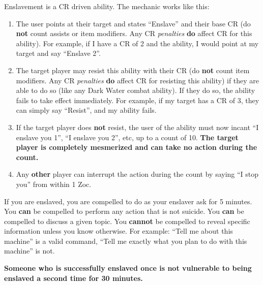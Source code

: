 \documentclass[green]{elementals}
\begin{document}
\name{\gEnslave{}} 

Enslavement is a CR driven ability. The mechanic works like this:

\begin{enumerate}
 \item The user points at their target and states ``Enslave'' and their base CR (do {\bf not} count assists or item modifiers. Any CR \emph{penalties} {\bf do} affect CR for this ability). For example, if I have a CR of 2 and the ability, I would point at my target and say ``Enslave 2''. 
 \item The target player may resist this ability with their CR (do {\bf not} count item modifiers. Any CR \emph{penalties} {\bf do} affect CR for resisting this ability) if they are able to do so (like any Dark Water combat ability). If they do so, the ability fails to take effect immediately. For example, if my target has a CR of 3, they can simply say ``Resist'', and my ability fails.
 \item If the target player does {\bf not} resist, the user of the ability must now incant ``I enslave you 1'', ``I enslave you 2'', etc, up to a count of 10. {\bf The target player is completely mesmerized and can take no action during the count.}
 \item Any {\bf other} player can interrupt the action during the count by saying ``I stop you'' from within 1 Zoc.
\end{enumerate}

If you are enslaved, you are compelled to do as your enslaver ask for 5 minutes. You {\bf can} be compelled to perform any action that is not suicide. You {\bf can} be compelled  to discuss a given topic. You {\bf cannot} be compelled to reveal specific information unless you know otherwise. For example: ``Tell me about this machine'' is a valid command, ``Tell me exactly what you plan to do with this machine'' is not.

{\bf Someone who is successfully enslaved once is not vulnerable to being enslaved a second time for 30 minutes.}
\end{document}
